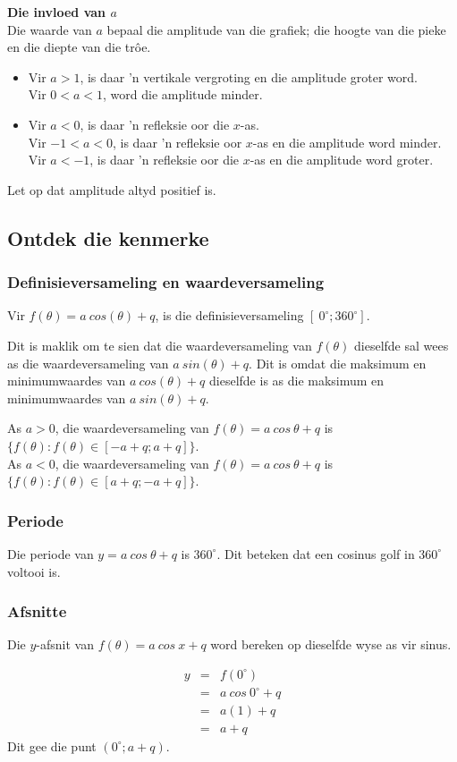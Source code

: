 \textbf{Die invloed van $a$} \\
Die waarde van $a$ bepaal die amplitude van die grafiek; die hoogte van die pieke en die diepte van
die trôe.

\begin{itemize}
 \item Vir $a > 1$, is daar ’n vertikale vergroting en die amplitude groter word.\\
Vir $0 < a < 1$, word die amplitude minder.

\item 
Vir $a < 0$, is daar ’n refleksie oor die $x$-as.\\
Vir $−1 < a < 0$, is daar ’n refleksie oor $x$-as en die amplitude word minder.
Vir $a < −1$, is daar ’n refleksie oor die $x$-as en die amplitude word groter.

\end{itemize}

Let op dat amplitude altyd positief is.


\subsection*{Ontdek die kenmerke}
\subsubsection*{Definisieversameling en waardeversameling}
\nopagebreak
Vir $f(\theta )=a~cos(\theta )+q$, is die definisieversameling $[~0^{\circ}; 360^{\circ}]$.\par
 
Dit is maklik om te sien dat die waardeversameling van $f(\theta )$ dieselfde sal wees as die waardeversameling van $a~sin(\theta )+q$. Dit is omdat die maksimum en minimumwaardes van $a~cos(\theta )+q$ dieselfde is as die maksimum en minimumwaardes van $a~sin(\theta )+q$.\par 
As $a>0$, die waardeversameling van $f(\theta)=a~cos~\theta+q$ is $\{f(\theta): f(\theta) \in [-a+q; a+q]\}$. \\
As $a<0$, die waardeversameling van $f(\theta)=a~cos~\theta+q$ is $\{f(\theta): f(\theta) \in [a+q; -a+q]\}$.
\subsubsection*{Periode}
Die periode van  $y=a~cos~\theta+q$ is $360^{\circ}$. Dit beteken dat een cosinus golf in $360^{\circ}$ voltooi is. 
\subsubsection*{Afsnitte}
\nopagebreak
Die $y$-afsnit van $f(\theta )=a~cos~x+q$ word bereken op dieselfde wyse as vir sinus.\par 
\nopagebreak\noindent{}
\begin{eqnarray*}
  y &=& f({0}^{\circ}) \\
    &=& a~cos~ 0^{\circ } + q \\
    &=& a(1) + q \\
    &=& a + q
\end{eqnarray*}
Dit gee die punt $(0^{\circ};a+q)$.

